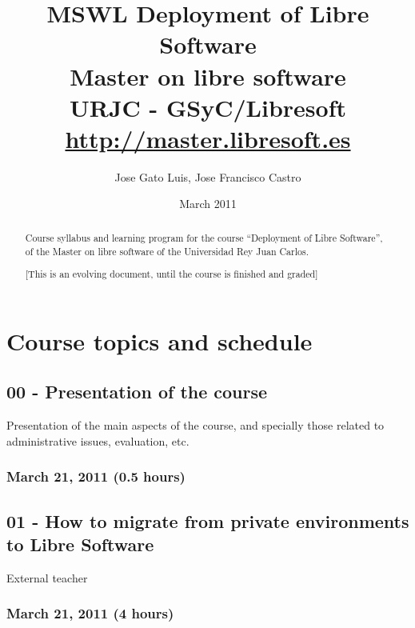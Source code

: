 \documentclass[a4paper]{article}
\title{MSWL Deployment of Libre Software \\
Master on libre software \\
URJC - GSyC/Libresoft \\
\url{http://master.libresoft.es}}
\author{Jose Gato Luis, Jose Francisco Castro}
\date{March 2011}
\begin{document}
\maketitle

\begin{abstract}
Course syllabus and learning program for the course ``Deployment of Libre Software'', of the Master on libre software of the
Universidad Rey Juan Carlos.

[This is an evolving document, until the course is finished and graded]
\end{abstract}

\tableofcontents

\section{Course topics and schedule}

\subsection{00 - Presentation of the course}

Presentation of the main aspects of the course, and specially those
related to administrative issues, evaluation, etc.

\subsubsection{March 21, 2011 (0.5 hours)}

\subsection{01 - How to migrate from private environments to Libre Software}

External teacher

\subsubsection{March 21, 2011 (4 hours)}
\end{document}
